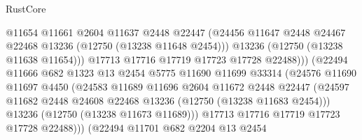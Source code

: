 \begin{lexlean}{RustCore}
\begin{coremodule}
                                    @11654
                                    @11661
                                    @2604
                                    @11637
                                    @2448
                                    @22447
                                    (@24456
                                      @11647
                                      @2448
                                      @24467
                                      @22468
                                      @13236
                                      (@12750 (@13238 @11648 @2454)))
                                    @13236
                                    (@12750 (@13238 @11638 @11654)))
                                  @17713
                                  @17716
                                  @17719
                                  @17723
                                  @17728
                                  @22488)))
                            (@22494
                              @11666
                              @682
                              @1323
                              @13
                              @2454
                              @5775
                              @11690
                              @11699
                              @33314
                              (@24576
                                @11690
                                @11697
                                @4450
                                (@24583
                                  @11689
                                  @11696
                                  @2604
                                  @11672
                                  @2448
                                  @22447
                                  (@24597
                                    @11682
                                    @2448
                                    @24608
                                    @22468
                                    @13236
                                    (@12750 (@13238 @11683 @2454)))
                                  @13236
                                  (@12750 (@13238 @11673 @11689)))
                                @17713
                                @17716
                                @17719
                                @17723
                                @17728
                                @22488)))
                          (@22494
                            @11701
                            @682
                            @2204
                            @13
                            @2454

\end{coremodule}
\end{lexlean}
